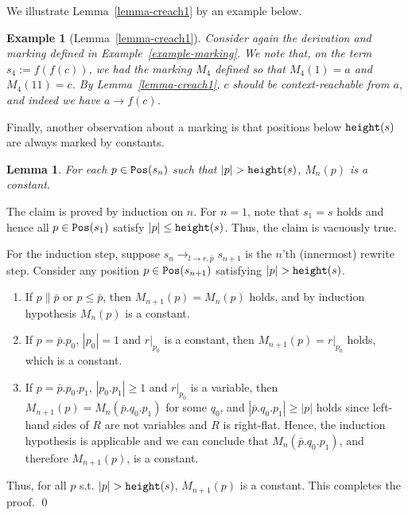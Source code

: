 \documentclass{LMCS}
\theoremstyle{plain}
\newtheorem{lemma}[thm]{Lemma}
\newtheorem{example}[thm]{Example}
\newcommand\Pos{{\tt Pos}}
\begin{document}
We illustrate Lemma~\ref{lemma-creach1} by an example below.
\begin{example}[Lemma~\ref{lemma-creach1}]
Consider again the derivation and marking defined in
Example~\ref{example-marking}.
We note that, on the term $s_4 := f(f(c))$,
we had the marking $M_4$ defined so that
$M_4(1) = a$ and $M_4(11) = c$.
By Lemma~\ref{lemma-creach1}, $c$ should be context-reachable
from $a$, and indeed we have $a \to f(c)$.
\end{example}

Finally, another observation about a marking is 
that positions below ${\tt height}(s)$ are always
marked by constants.
\begin{lemma}\label{lemma-creach2}
For each $p\in\Pos(s_n)$ such that $|p| >{\tt height}(s)$,
$M_n(p)$ is a constant.
\end{lemma}
\proof
The claim is proved by induction on $n$.
For $n=1$, note that $s_1=s$ holds and hence all $p\in\Pos(s_1)$
satisfy $|p|\leq{\tt height}(s)$. Thus, the claim is vacuously true.

For the induction step,
suppose $s_n \rightarrow_{l\rightarrow r,\bar{p}} s_{n+1}$ is
the $n$'th (innermost) rewrite step. Consider any position $p\in\Pos(s_{n+1})$ satisfying
$|p| > {\tt height}(s)$.
\begin{enumerate}[$\bullet$]
\item If $p\parallel \bar{p}$ or $p\leq \bar{p}$,
then $M_{n+1}(p) = M_n(p)$ holds, and by induction hypothesis
$M_n(p)$ is a constant.
\item
If $p = \bar{p}.p_0$, $|p_0|=1$ and $r|_{p_0}$ is a constant, 
then $M_{n+1}(p) = r|_{p_0}$ holds, which is a constant.
\item
If $p = \bar{p}.p_0.p_1$, $|p_0.p_1|\geq 1$ and $r|_{p_0}$ is a variable, then
$M_{n+1}(p) = M_{n}(\bar{p}.q_0.p_1)$ for some $q_0$, and
$|\bar{p}.q_0.p_1| \geq |p|$ holds since left-hand sides of $R$
are not variables and $R$ is right-flat.
Hence, the induction hypothesis is applicable and
we can conclude that $M_n(\bar{p}.q_0.p_1)$, and therefore
$M_{n+1}(p)$, is a constant.
\end{enumerate}
Thus, for all $p$ s.t. $|p|>{\tt height}(s)$, $M_{n+1}(p)$ is a constant.
This completes the proof. \qed
\end{document}
